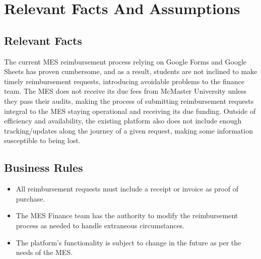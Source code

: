 \documentclass[12pt]{article}
\begin{document}
\section{Relevant Facts And Assumptions}
\subsection{Relevant Facts}
The current MES reimbursement process relying on Google Forms and Google Sheets has proven cumbersome, and as a result, students are not inclined to make timely reimbursement requests, introducing avoidable problems to the finance team.
The MES does not receive its due fees from McMaster University unless they pass their audits, making the process of submitting reimbursement requests integral to the MES staying operational and receiving its due funding.
Outside of efficiency and availability, the existing platform also does not include enough tracking/updates along the journey of a given request, making some information susceptible to being lost.

\subsection{Business Rules}
\begin{itemize}
    \item All reimbursement requests must include a receipt or invoice as proof of purchase.
    \item The MES Finance team has the authority to modify the reimbursement process as needed to handle extraneous circumstances.
    \item The platform’s functionality is subject to change in the future as per the needs of the MES.
\end{itemize}
\end{document}
